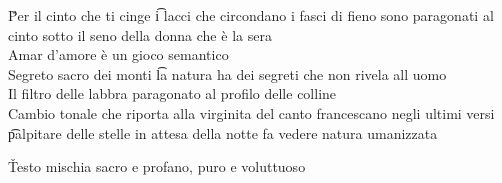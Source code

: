 \documentclass[12pt]{article}
\begin{document}
\v

Per il cinto che ti cinge \t i lacci che circondano i fasci di fieno sono paragonati al cinto sotto il seno della donna che è la sera \\
Amar d'amore è un gioco semantico \\
Segreto sacro dei monti \t la natura ha dei segreti che non rivela all uomo \\
Il filtro delle labbra paragonato al profilo delle colline \\
Cambio tonale che riporta alla virginita del canto francescano negli ultimi versi \t palpitare delle stelle in attesa della notte fa vedere natura umanizzata

\v

Testo mischia sacro e profano, puro e voluttuoso
\end{document}
